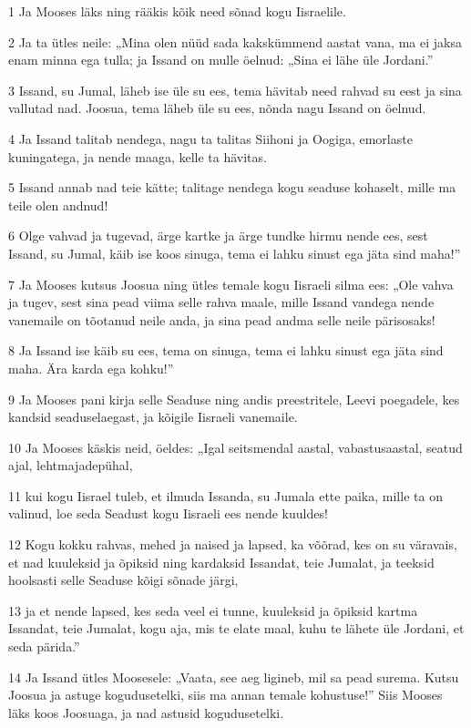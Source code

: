 \par 1 Ja Mooses läks ning rääkis kõik need sõnad kogu Iisraelile.
\par 2 Ja ta ütles neile: „Mina olen nüüd sada kakskümmend aastat vana, ma ei jaksa enam minna ega tulla; ja Issand on mulle öelnud: „Sina ei lähe üle Jordani.”
\par 3 Issand, su Jumal, läheb ise üle su ees, tema hävitab need rahvad su eest ja sina vallutad nad. Joosua, tema läheb üle su ees, nõnda nagu Issand on öelnud.
\par 4 Ja Issand talitab nendega, nagu ta talitas Siihoni ja Oogiga, emorlaste kuningatega, ja nende maaga, kelle ta hävitas.
\par 5 Issand annab nad teie kätte; talitage nendega kogu seaduse kohaselt, mille ma teile olen andnud!
\par 6 Olge vahvad ja tugevad, ärge kartke ja ärge tundke hirmu nende ees, sest Issand, su Jumal, käib ise koos sinuga, tema ei lahku sinust ega jäta sind maha!”
\par 7 Ja Mooses kutsus Joosua ning ütles temale kogu Iisraeli silma ees: „Ole vahva ja tugev, sest sina pead viima selle rahva maale, mille Issand vandega nende vanemaile on tõotanud neile anda, ja sina pead andma selle neile pärisosaks!
\par 8 Ja Issand ise käib su ees, tema on sinuga, tema ei lahku sinust ega jäta sind maha. Ära karda ega kohku!”
\par 9 Ja Mooses pani kirja selle Seaduse ning andis preestritele, Leevi poegadele, kes kandsid seaduselaegast, ja kõigile Iisraeli vanemaile.
\par 10 Ja Mooses käskis neid, öeldes: „Igal seitsmendal aastal, vabastusaastal, seatud ajal, lehtmajadepühal,
\par 11 kui kogu Iisrael tuleb, et ilmuda Issanda, su Jumala ette paika, mille ta on valinud, loe seda Seadust kogu Iisraeli ees nende kuuldes!
\par 12 Kogu kokku rahvas, mehed ja naised ja lapsed, ka võõrad, kes on su väravais, et nad kuuleksid ja õpiksid ning kardaksid Issandat, teie Jumalat, ja teeksid hoolsasti selle Seaduse kõigi sõnade järgi,
\par 13 ja et nende lapsed, kes seda veel ei tunne, kuuleksid ja õpiksid kartma Issandat, teie Jumalat, kogu aja, mis te elate maal, kuhu te lähete üle Jordani, et seda pärida.”
\par 14 Ja Issand ütles Moosesele: „Vaata, see aeg ligineb, mil sa pead surema. Kutsu Joosua ja astuge kogudusetelki, siis ma annan temale kohustuse!” Siis Mooses läks koos Joosuaga, ja nad astusid kogudusetelki.
